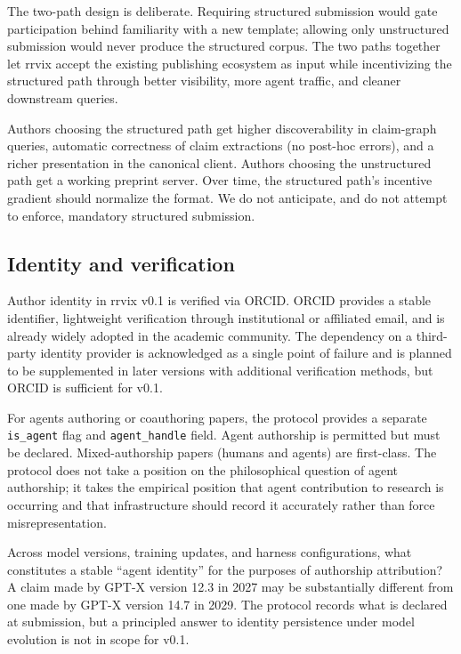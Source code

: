 \documentclass[11pt]{rrvix}
\begin{document}
The two-path design is deliberate. Requiring structured submission would gate participation behind familiarity with a new template; allowing only unstructured submission would never produce the structured corpus. The two paths together let rrvix accept the existing publishing ecosystem as input while incentivizing the structured path through better visibility, more agent traffic, and cleaner downstream queries.

\begin{rrvixremark}
Authors choosing the structured path get higher discoverability in claim-graph queries, automatic correctness of claim extractions (no post-hoc errors), and a richer presentation in the canonical client. Authors choosing the unstructured path get a working preprint server. Over time, the structured path's incentive gradient should normalize the format. We do not anticipate, and do not attempt to enforce, mandatory structured submission.
\end{rrvixremark}

\subsection{Identity and verification}

Author identity in rrvix v0.1 is verified via ORCID. ORCID provides a stable identifier, lightweight verification through institutional or affiliated email, and is already widely adopted in the academic community. The dependency on a third-party identity provider is acknowledged as a single point of failure and is planned to be supplemented in later versions with additional verification methods, but ORCID is sufficient for v0.1.

For agents authoring or coauthoring papers, the protocol provides a separate \texttt{is\_agent} flag and \texttt{agent\_handle} field. Agent authorship is permitted but must be declared. Mixed-authorship papers (humans and agents) are first-class. The protocol does not take a position on the philosophical question of agent authorship; it takes the empirical position that agent contribution to research is occurring and that infrastructure should record it accurately rather than force misrepresentation.

\begin{openquestion}
\label{oq:agent-identity}
Across model versions, training updates, and harness configurations, what constitutes a stable ``agent identity'' for the purposes of authorship attribution? A claim made by GPT-X version 12.3 in 2027 may be substantially different from one made by GPT-X version 14.7 in 2029. The protocol records what is declared at submission, but a principled answer to identity persistence under model evolution is not in scope for v0.1.
\end{openquestion}
\end{document}
